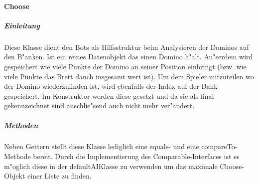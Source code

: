 \paragraph{Choose}
\label{par:choose}
\subparagraph{Einleitung}
Diese Klasse dient den Bots als Hilfsstruktur beim Analysieren der Dominos auf den B"anken. Ist ein reines Datenobjekt das einen Domino h"alt. Au"serdem wird gespeichert wie viele Punkte der Domino an seiner Position einbringt (bzw. wie viele Punkte das Brett danch insgesamt wert ist). Um dem Spieler mitzuteilen wo der Domino wiederzufinden ist, wird ebenfalls der Index auf der Bank gespeichert. Im Konstruktor werden diese gesetzt und da sie als final gekennzeichnet sind anschlie"send auch nicht mehr ver"andert. 

\subparagraph{Methoden}
Neben Gettern stellt diese Klasse lediglich eine equals- und eine compareTo-Methode bereit. Durch die Implementierung des Comparable-Interfaces ist es m"oglich diese in der defaultAIKlasse zu verwenden um das maximale Choose-Objekt einer Liste zu finden. 
